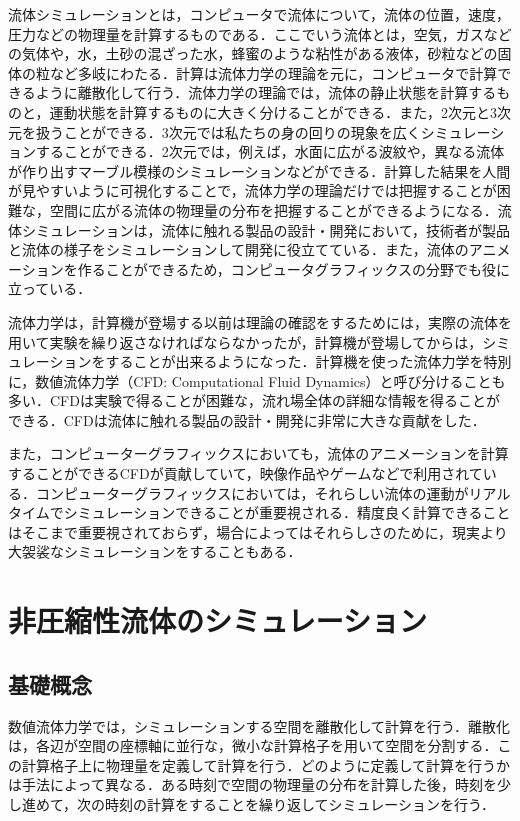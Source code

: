 \documentclass[a4j,12pt]{jreport}
\begin{document}
流体シミュレーションとは，コンピュータで流体について，流体の位置，速度，圧力などの物理量を計算するものである．ここでいう流体とは，空気，ガスなどの気体や，水，土砂の混ざった水，蜂蜜のような粘性がある液体，砂粒などの固体の粒など多岐にわたる．計算は流体力学の理論を元に，コンピュータで計算できるように離散化して行う．流体力学の理論では，流体の静止状態を計算するものと，運動状態を計算するものに大きく分けることができる．また，2次元と3次元を扱うことができる．3次元では私たちの身の回りの現象を広くシミュレーションすることができる．2次元では，例えば，水面に広がる波紋や，異なる流体が作り出すマーブル模様のシミュレーションなどができる．計算した結果を人間が見やすいように可視化することで，流体力学の理論だけでは把握することが困難な，空間に広がる流体の物理量の分布を把握することができるようになる．流体シミュレーションは，流体に触れる製品の設計・開発において，技術者が製品と流体の様子をシミュレーションして開発に役立てている．また，流体のアニメーションを作ることができるため，コンピュータグラフィックスの分野でも役に立っている．

流体力学は，計算機が登場する以前は理論の確認をするためには，実際の流体を用いて実験を繰り返さなければならなかったが，計算機が登場してからは，シミュレーションをすることが出来るようになった．計算機を使った流体力学を特別に，数値流体力学（CFD: Computational Fluid Dynamics）と呼び分けることも多い．CFDは実験で得ることが困難な，流れ場全体の詳細な情報を得ることができる．CFDは流体に触れる製品の設計・開発に非常に大きな貢献をした．

また，コンピューターグラフィックスにおいても，流体のアニメーションを計算することができるCFDが貢献していて，映像作品やゲームなどで利用されている．コンピューターグラフィックスにおいては，それらしい流体の運動がリアルタイムでシミュレーションできることが重要視される．精度良く計算できることはそこまで重要視されておらず，場合によってはそれらしさのために，現実より大袈裟なシミュレーションをすることもある．
\chapter{非圧縮性流体のシミュレーション} \label{chapter:3}
\section{基礎概念}
数値流体力学では，シミュレーションする空間を離散化して計算を行う．離散化は，各辺が空間の座標軸に並行な，微小な計算格子を用いて空間を分割する．この計算格子上に物理量を定義して計算を行う．どのように定義して計算を行うかは手法によって異なる．ある時刻で空間の物理量の分布を計算した後，時刻を少し進めて，次の時刻の計算をすることを繰り返してシミュレーションを行う．
\end{document}
